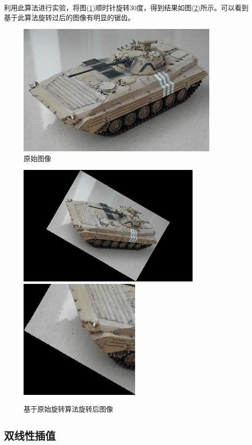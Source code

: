 \documentclass[UTF-8, a4paper, 12pt]{ctexart}
\begin{document}
利用此算法进行实验，将图(\ref{tank})顺时针旋转30度，得到结果如图(\ref{tank_f})所示。可以看到基于此算法旋转过后的图像有明显的锯齿。
\begin{figure}[htbp]
    \centering
    \includegraphics[width=10cm]{fig/tank.bmp}
    \caption{原始图像}
    \label{tank}
\end{figure}
\begin{figure}[htbp]
    \centering
    \includegraphics[height=6cm]{fig/tank_forward.bmp}
    \includegraphics[height=6cm]{fig/tank_forward2.bmp}
    \caption{基于原始旋转算法旋转后图像}
    \label{tank_f}
\end{figure}



\subsection{双线性插值}
\end{document}

